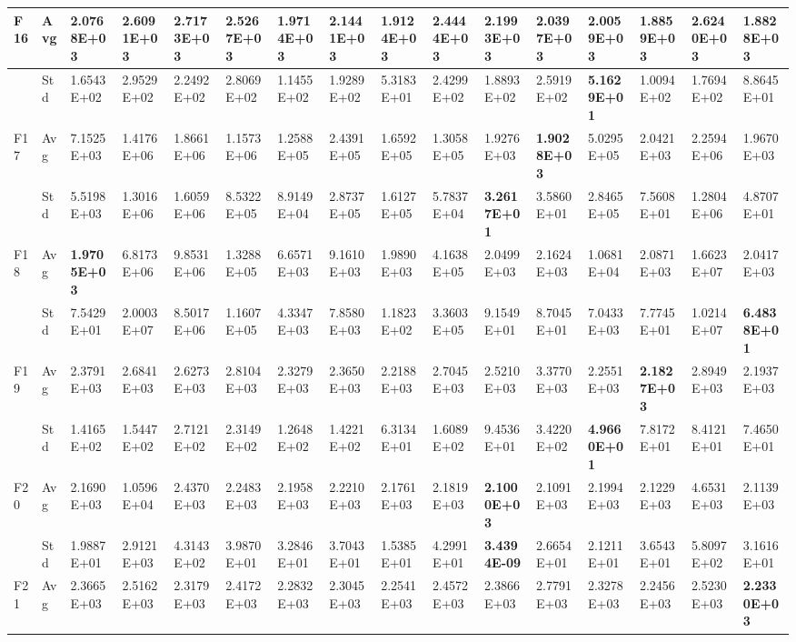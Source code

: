 \documentclass{article} %
\begin{document}
\begin{tabular}{|p{0.3in}|p{0.3in}|p{0.3in}|p{0.3in}|p{0.3in}|p{0.3in}|p{0.3in}|p{0.3in}|p{0.3in}|p{0.3in}|p{0.3in}|p{0.3in}|p{0.3in}|p{0.3in}|p{0.3in}|p{0.5in}|}
F16 & Avg & 2.0768E+03 & 2.6091E+03 & 2.7173E+03 & 2.5267E+03 & 1.9714E+03 & 2.1441E+03 & 1.9124E+03 & 2.4444E+03 & 2.1993E+03 & 2.0397E+03 & 2.0059E+03 & 1.8859E+03 & 2.6240E+03 & \textbf{1.8828E+03} \\ \hline 
 & Std & 1.6543E+02 & 2.9529E+02 & 2.2492E+02 & 2.8069E+02 & 1.1455E+02 & 1.9289E+02 & 5.3183E+01 & 2.4299E+02 & 1.8893E+02 & 2.5919E+02 & \textbf{5.1629E+01} & 1.0094E+02 & 1.7694E+02 & 8.8645E+01 \\ \hline 
F17 & Avg & 7.1525E+03 & 1.4176E+06 & 1.8661E+06 & 1.1573E+06 & 1.2588E+05 & 2.4391E+05 & 1.6592E+05 & 1.3058E+05 & 1.9276E+03 & \textbf{1.9028E+03} & 5.0295E+05 & 2.0421E+03 & 2.2594E+06 & 1.9670E+03 \\ \hline 
 & Std & 5.5198E+03 & 1.3016E+06 & 1.6059E+06 & 8.5322E+05 & 8.9149E+04 & 2.8737E+05 & 1.6127E+05 & 5.7837E+04 & \textbf{3.2617E+01} & 3.5860E+01 & 2.8465E+05 & 7.5608E+01 & 1.2804E+06 & 4.8707E+01 \\ \hline 
F18 & Avg & \textbf{1.9705E+03} & 6.8173E+06 & 9.8531E+06 & 1.3288E+05 & 6.6571E+03 & 9.1610E+03 & 1.9890E+03 & 4.1638E+05 & 2.0499E+03 & 2.1624E+03 & 1.0681E+04 & 2.0871E+03 & 1.6623E+07 & 2.0417E+03 \\ \hline 
 & Std & 7.5429E+01 & 2.0003E+07 & 8.5017E+06 & 1.1607E+05 & 4.3347E+03 & 7.8580E+03 & 1.1823E+02 & 3.3603E+05 & 9.1549E+01 & 8.7045E+01 & 7.0433E+03 & 7.7745E+01 & 1.0214E+07 & \textbf{6.4838E+01} \\ \hline 
F19 & Avg & 2.3791E+03 & 2.6841E+03 & 2.6273E+03 & 2.8104E+03 & 2.3279E+03 & 2.3650E+03 & 2.2188E+03 & 2.7045E+03 & 2.5210E+03 & 3.3770E+03 & 2.2551E+03 & \textbf{2.1827E+03} & 2.8949E+03 & 2.1937E+03 \\ \hline 
 & Std & 1.4165E+02 & 1.5447E+02 & 2.7121E+02 & 2.3149E+02 & 1.2648E+02 & 1.4221E+02 & 6.3134E+01 & 1.6089E+02 & 9.4536E+01 & 3.4220E+02 & \textbf{4.9660E+01} & 7.8172E+01 & 8.4121E+01 & 7.4650E+01 \\ \hline 
F20 & Avg & 2.1690E+03 & 1.0596E+04 & 2.4370E+03 & 2.2483E+03 & 2.1958E+03 & 2.2210E+03 & 2.1761E+03 & 2.1819E+03 & \textbf{2.1000E+03} & 2.1091E+03 & 2.1994E+03 & 2.1229E+03 & 4.6531E+03 & 2.1139E+03 \\ \hline 
 & Std & 1.9887E+01 & 2.9121E+03 & 4.3143E+02 & 3.9870E+01 & 3.2846E+01 & 3.7043E+01 & 1.5385E+01 & 4.2991E+01 & \textbf{3.4394E-09} & 2.6654E+01 & 2.1211E+01 & 3.6543E+01 & 5.8097E+02 & 3.1616E+01 \\ \hline 
F21 & Avg & 2.3665E+03 & 2.5162E+03 & 2.3179E+03 & 2.4172E+03 & 2.2832E+03 & 2.3045E+03 & 2.2541E+03 & 2.4572E+03 & 2.3866E+03 & 2.7791E+03 & 2.3278E+03 & 2.2456E+03 & 2.5230E+03 & \textbf{2.2330E+03} \\ \hline 

\end{tabular}
\end{document}
